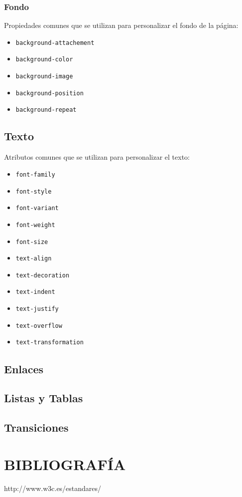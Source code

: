 \documentclass{beamer}
\begin{document}
\begin{frame}[fragile] %
\frametitle{Fondo}
	Propiedades comunes que se utilizan para personalizar el fondo de la página:
	\begin{itemize}
	\item \verb|background-attachement|
	\item \verb|background-color|	
	\item \verb|background-image|
	\item \verb|background-position|
	\item \verb|background-repeat|
	\end{itemize}
\end{frame}

	\subsection{Texto}
\begin{frame}[fragile]
	Atributos comunes que se utilizan para personalizar el texto:
	\begin{multicols}{2}
	\begin{itemize}
	\item \verb|font-family|
	\item \verb|font-style|
	\item \verb|font-variant|
	\item \verb|font-weight|
	\item \verb|font-size|
	\item \verb|text-align|
	\item \verb|text-decoration|
	\item \verb|text-indent|
	\item \verb|text-justify|
	\item \verb|text-overflow|
	\item \verb|text-transformation|
	\end{itemize}
	\end{multicols}
	
\end{frame}

	\subsection{Enlaces}
	\subsection{Listas y Tablas}
	\subsection{Transiciones}
	
\section{BIBLIOGRAFÍA}
\begin{frame}
	http://www.w3c.es/estandares/
\end{frame}
\end{document}
